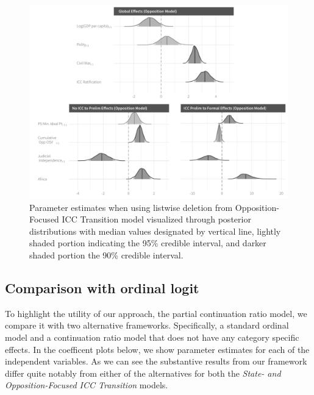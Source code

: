 \begin{figure}
    \centering
    \includegraphics[width=1\textwidth]{rebelCoefSumm_noImp.pdf}
    \caption{Parameter estimates when using listwise deletion from Opposition-Focused ICC Transition model visualized through posterior distributions with median values designated by vertical line, lightly shaded portion indicating the 95\% credible interval, and darker shaded portion the 90\% credible interval.}
    \label{fig:rebelModel_noImp}
\end{figure}

\subsection*{Comparison with ordinal logit}

To highlight the utility of our approach, the partial continuation ratio model, we compare it with two alternative frameworks. Specifically, a standard ordinal model and a continuation ratio model that does not have any category specific effects.  In the coefficent plots below, we show parameter estimates for each of the independent variables. As we can see the substantive results from our framework differ quite notably from either of the alternatives for both the \emph{State- and Opposition-Focused ICC Transition} models.

